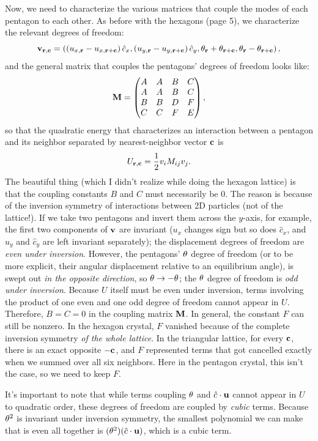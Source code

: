 \documentclass[12pt]{article}
\begin{document}
Now, we need to characterize the various matrices that couple the modes of each pentagon to each other. As before with the hexagons (page 5), we characterize the relevant degrees of freedom:
\[ \mathbf{v}_{\mathbf{r},\mathbf{c}} = \left( \left(u_{x,\mathbf{r}} - u_{x,\mathbf{r} + \mathbf{c}}\right)\hat c_x, \left( u_{y,\mathbf{r}} - u_{y,\mathbf{r} + \mathbf{c}} \right) \hat c_y, \theta_{\mathbf{r}} + \theta_{\mathbf{r} + \mathbf{c}}, \theta_{\mathbf{r}} - \theta_{\mathbf{r} + \mathbf{c}} \right),\]
and the general matrix that couples the pentagons' degrees of freedom looks like:
\[ \mathbf{M} = \left(\begin{matrix} A & A & B & C \\ A & A & B & C \\ B & B & D & F \\ C & C & F & E\end{matrix}\right),\]
so that the quadratic energy that characterizes an interaction between a pentagon and its neighbor separated by nearest-neighbor vector $\mathbf{c}$ is
\[ U_{\mathbf{r}, \mathbf{c}} = \frac{1}{2} v_iM_{ij}v_j.\]
The beautiful thing (which I didn't realize while doing the hexagon lattice) is that the coupling constants $B$ and $C$ must necessarily be 0. The reason is because of the inversion symmetry of interactions between 2D particles (not of the lattice!). If we take two pentagons and invert them across the $y$-axis, for example, the first two components of $\mathbf{v}$ are invariant ($u_x$ changes sign but so does $\hat c_x$, and $u_y$ and $\hat c_y$ are left invariant separately); the displacement degrees of freedom are \emph{even under inversion}. However, the pentagons' $\theta$ degree of freedom (or to be more explicit, their angular displacement relative to an equilibrium angle), is swept out \emph{in the opposite direction}, so $\theta \rightarrow -\theta$; the $\theta$ degree of freedom is \emph{odd under inversion}. Because $U$ itself must be even under inversion, terms involving the product of one even and one odd degree of freedom cannot appear in $U$. Therefore, $B=C=0$ in the coupling matrix $\mathbf{M}$. In general, the constant $F$ can still be nonzero. In the hexagon crystal, $F$ vanished because of the complete inversion symmetry \emph{of the whole lattice}. In the triangular lattice, for every $\mathbf{c}$, there is an exact opposite $-\mathbf{c}$, and $F$ represented terms that got cancelled exactly when we summed over all six neighbors. Here in the pentagon crystal, this isn't the case, so we need to keep $F$.

It's important to note that while terms coupling $\theta$ and $\hat c \cdot \mathbf{u}$ cannot appear in $U$ to quadratic order, these degrees of freedom are coupled by \emph{cubic} terms. Because $\theta^2$ is invariant under inversion symmetry, the smallest polynomial we can make that is even all together is $(\theta^2) (\hat c \cdot \mathbf{u})$, which is a cubic term.
\end{document}
